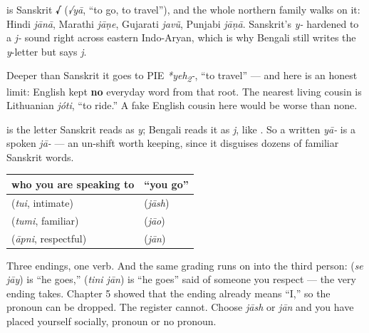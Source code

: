 \begin{cousinweb}
\textbf{} is Sanskrit \textbf{√} (\emph{√yā}, \textquotedblleft{}to go, to travel\textquotedblright{}), and the whole northern family walks on it: Hindi \emph{jānā}, Marathi \emph{jāṇe}, Gujarati \emph{javũ}, Punjabi \emph{jāṇā}. Sanskrit's \emph{y-} hardened to a \emph{j-} sound right across eastern Indo-Aryan, which is why Bengali still writes the \emph{y}-letter \textbf{} but says \emph{j}.

Deeper than Sanskrit it goes to PIE \emph{*yeh\textsubscript{2}-}, \textquotedblleft{}to travel\textquotedblright{} — and here is an honest limit: English kept \textbf{no} everyday word from that root. The nearest living cousin is Lithuanian \emph{jóti}, \textquotedblleft{}to ride.\textquotedblright{} A fake English cousin here would be worse than none.
\end{cousinweb}

\begin{sounds}
\textbf{} is the letter Sanskrit reads as \emph{y}; Bengali reads it as \emph{j}, like \textbf{}. So a written \emph{yā-} is a spoken \emph{jā-} — an un-shift worth keeping, since it disguises dozens of familiar Sanskrit words.
\end{sounds}

\begin{grammarlens}[title={Grammar Lens: the respect is not in the pronoun, it is in the ending}]
\noindent
\begin{tabularx}{\linewidth}{@{}>{\raggedright\arraybackslash}X>{\raggedright\arraybackslash}X@{}}
\toprule
\textbf{who you are speaking to} & \textbf{\textquotedblleft{}you go\textquotedblright{}} \\
\midrule
\bn{তুই} (\emph{tui}, intimate) & \bn{যাস} (\emph{jāsh}) \\
\bn{তুমি} (\emph{tumi}, familiar) & \bn{যাও} (\emph{jāo}) \\
\bn{আপনি} (\emph{āpni}, respectful) & \bn{যান} (\emph{jān}) \\
\bottomrule
\end{tabularx}

Three endings, one verb. And the same grading runs on into the third person:   (\emph{se jāy}) is \textquotedblleft{}he goes,\textquotedblright{}   (\emph{tini jān}) is \textquotedblleft{}he goes\textquotedblright{} said of someone you respect — the very ending  takes. Chapter 5 showed that the ending already means \textquotedblleft{}I,\textquotedblright{} so the pronoun can be dropped. The register cannot. Choose \emph{jāsh} or \emph{jān} and you have placed yourself socially, pronoun or no pronoun.
\end{grammarlens}

